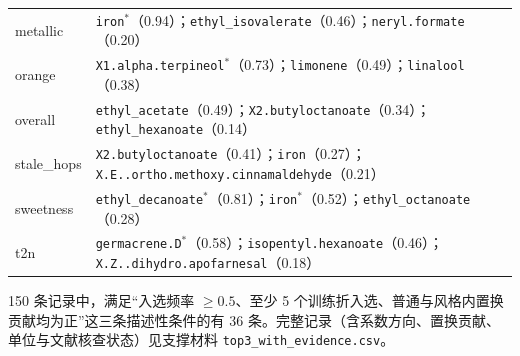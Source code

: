 \begin{longtable}{L{0.30\columnwidth}L{0.62\columnwidth}}
metallic & \texttt{iron}$^{\ast}$（0.94）；\texttt{ethyl\_isovalerate}（0.46）；\texttt{neryl.formate}（0.20） \\
orange & \texttt{X1.alpha.terpineol}$^{\ast}$（0.73）；\texttt{limonene}（0.49）；\texttt{linalool}（0.38） \\
overall & \texttt{ethyl\_acetate}（0.49）；\texttt{X2.butyloctanoate}（0.34）；\texttt{ethyl\_hexanoate}（0.14） \\
stale\_hops & \texttt{X2.butyloctanoate}（0.41）；\texttt{iron}（0.27）；\texttt{X.E..ortho.methoxy.cinnamaldehyde}（0.21） \\
sweetness & \texttt{ethyl\_decanoate}$^{\ast}$（0.81）；\texttt{iron}$^{\ast}$（0.52）；\texttt{ethyl\_octanoate}（0.28） \\
t2n & \texttt{germacrene.D}$^{\ast}$（0.58）；\texttt{isopentyl.hexanoate}（0.46）；\texttt{X.Z..dihydro.apofarnesal}（0.18） \\
\end{longtable}

150 条记录中，满足“入选频率 $\ge0.5$、至少 5 个训练折入选、普通与风格内置换贡献均为正”这三条描述性条件的有 36 条。完整记录（含系数方向、置换贡献、单位与文献核查状态）见支撑材料 \texttt{top3\_with\_evidence.csv}。
